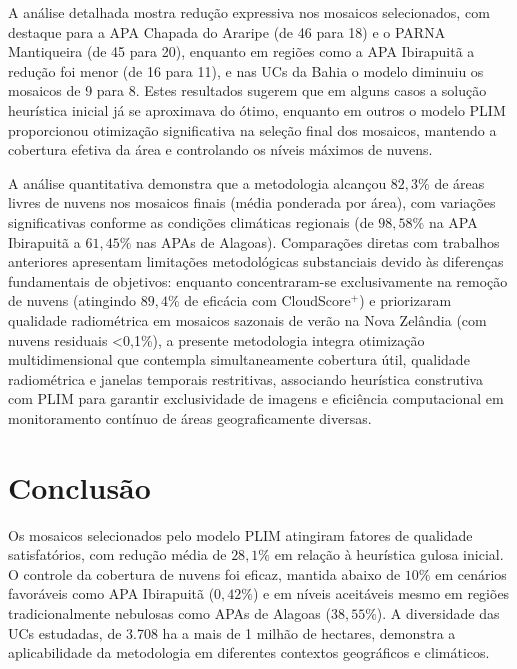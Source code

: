 \documentclass[a4paper,11pt]{article}
\begin{document}
A análise detalhada mostra redução expressiva nos mosaicos selecionados, com destaque para a APA Chapada do Araripe (de 46 para 18) e o PARNA Mantiqueira (de 45 para 20), enquanto em regiões como a APA Ibirapuitã a redução foi menor (de 16 para 11), e nas UCs da Bahia o modelo diminuiu os mosaicos de 9 para 8. Estes resultados sugerem que em alguns casos a solução heurística inicial já se aproximava do ótimo, enquanto em outros o modelo PLIM proporcionou otimização significativa na seleção final dos mosaicos, mantendo a cobertura efetiva da área e controlando os níveis máximos de nuvens.

A análise quantitativa demonstra que a metodologia alcançou $82,3\%$ de áreas livres de nuvens nos mosaicos finais (média ponderada por área), com variações significativas conforme as condições climáticas regionais (de $98,58\%$ na APA Ibirapuitã a $61,45\%$ nas APAs de Alagoas). Comparações diretas com trabalhos anteriores apresentam limitações metodológicas substanciais devido às diferenças fundamentais de objetivos: enquanto \citet{rodriguez-puerta:2024} concentraram-se exclusivamente na remoção de nuvens (atingindo $89,4\%$ de eficácia com CloudScore$^{+}$) e \citet{shepherd2020automated} priorizaram qualidade radiométrica em mosaicos sazonais de verão na Nova Zelândia (com nuvens residuais <0,1\%), a presente metodologia integra otimização multidimensional que contempla simultaneamente cobertura útil, qualidade radiométrica e janelas temporais restritivas, associando heurística construtiva com PLIM para garantir exclusividade de imagens e eficiência computacional em monitoramento contínuo de áreas geograficamente diversas.

\vspace{-8mm}
\section{Conclusão}
\vspace{-4mm}
Os mosaicos selecionados pelo modelo PLIM atingiram fatores de qualidade satisfatórios, com redução média de $28,1\%$ em relação à heurística gulosa inicial. O controle da cobertura de nuvens foi eficaz, mantida abaixo de $10\%$ em cenários favoráveis como APA Ibirapuitã ($0,42\%$) e em níveis aceitáveis mesmo em regiões tradicionalmente nebulosas como APAs de Alagoas ($38,55\%$). A diversidade das UCs estudadas, de 3.708 ha a mais de 1 milhão de hectares, demonstra a aplicabilidade da metodologia em diferentes contextos geográficos e climáticos.
\end{document}
